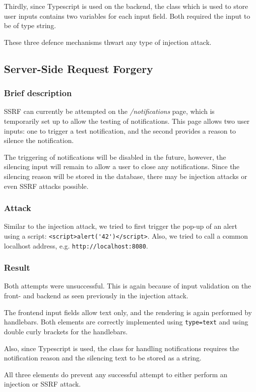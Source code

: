 Thirdly, since Typescript is used on the backend, the class which is used to store user inputs contains two variables for each input field. Both required the input to be of type string.

These three defence mechanisms thwart any type of injection attack.

\subsection{Server-Side Request Forgery}
\subsubsection{Brief description}
SSRF can currently be attempted on the \textit{/notifications} page, which is temporarily set up to allow the testing of notifications. This page allows two user inputs: one to trigger a test notification, and the second provides a reason to silence the notification.

The triggering of notifications will be disabled in the future, however, the silencing input will remain to allow a user to close any notifications. Since the silencing reason will be stored in the database, there may be injection attacks or even SSRF attacks possible.

\subsubsection{Attack}
Similar to the injection attack, we tried to first trigger the pop-up of an alert using a script: \lstinline "<script>alert('42')</script>". Also, we tried to call a common localhost address, e.g. \lstinline "http://localhost:8080". 

\subsubsection{Result}
Both attempts were unsuccessful. This is again because of input validation on the front- and backend as seen previously in the injection attack.

The frontend input fields allow text only, and the rendering is again performed by handlebars. Both elements are correctly implemented using \lstinline "type=text" and using double curly brackets for the handlebars.

Also, since Typescript is used, the class for handling notifications requires the notification reason and the silencing text to be stored as a string.

All three elements do prevent any successful attempt to either perform an injection or SSRF attack.